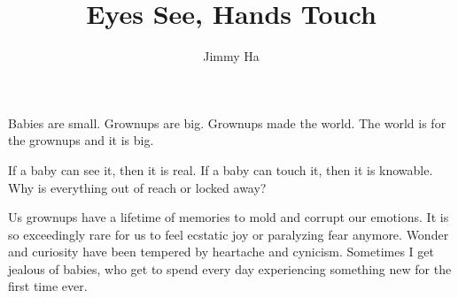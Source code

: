 \documentclass[14pt, letterpaper]{extarticle}
\begin{document}
 \title{\LARGE{Eyes See, Hands Touch}}
 \author{\normalsize{Jimmy Ha}}
 \date{}
  
\maketitle

Babies are small. Grownups are big. Grownups made the world. The world is for the grownups and it is big. 

\vspace{1\baselineskip}
If a baby can see it, then it is real. If a baby can touch it, then it is knowable. Why is everything out of reach or locked away?


\vspace{1\baselineskip}
Us grownups have a lifetime of memories to mold and corrupt our emotions. It is so exceedingly rare for us to feel ecstatic joy or paralyzing fear anymore. Wonder and curiosity have been tempered by heartache and cynicism. Sometimes I get jealous of babies, who get to spend every day experiencing something new for the first time ever.


  
  
\end{document}
